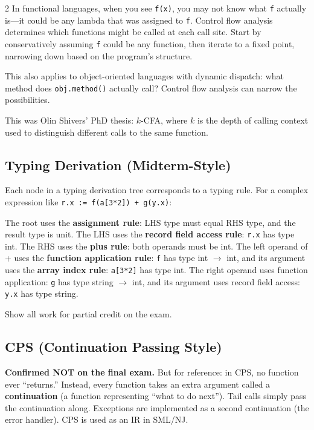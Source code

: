 \documentclass[9pt,landscape]{extarticle}
\begin{document}
\begin{multicols}{2}
In functional languages, when you see \texttt{f(x)}, you may not know what \texttt{f} actually is---it could be any lambda that was assigned to \texttt{f}. Control flow analysis determines which functions might be called at each call site. Start by conservatively assuming \texttt{f} could be any function, then iterate to a fixed point, narrowing down based on the program's structure.

This also applies to object-oriented languages with dynamic dispatch: what method does \texttt{obj.method()} actually call? Control flow analysis can narrow the possibilities.

This was Olin Shivers' PhD thesis: $k$-CFA, where $k$ is the depth of calling context used to distinguish different calls to the same function.

\subsection{Typing Derivation (Midterm-Style)}

Each node in a typing derivation tree corresponds to a typing rule. For a complex expression like \texttt{r.x := f(a[3*2]) + g(y.x)}:

The root uses the \textbf{assignment rule}: LHS type must equal RHS type, and the result type is unit. The LHS uses the \textbf{record field access rule}: \texttt{r.x} has type int. The RHS uses the \textbf{plus rule}: both operands must be int. The left operand of + uses the \textbf{function application rule}: \texttt{f} has type int $\to$ int, and its argument uses the \textbf{array index rule}: \texttt{a[3*2]} has type int. The right operand uses function application: \texttt{g} has type string $\to$ int, and its argument uses record field access: \texttt{y.x} has type string.

Show all work for partial credit on the exam.

\subsection{CPS (Continuation Passing Style)}

\textbf{Confirmed NOT on the final exam.} But for reference: in CPS, no function ever ``returns.'' Instead, every function takes an extra argument called a \textbf{continuation} (a function representing ``what to do next''). Tail calls simply pass the continuation along. Exceptions are implemented as a second continuation (the error handler). CPS is used as an IR in SML/NJ.


\end{multicols}
\end{document}
